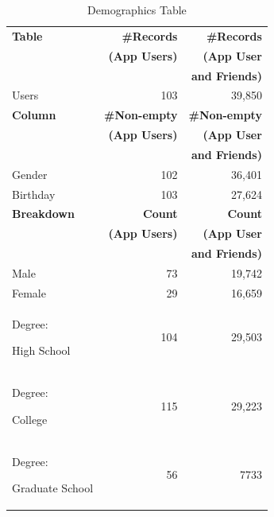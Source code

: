 \begin{table}
\centering
\caption{\small Demographics Table}
\label{tab:demographics}
\begin{tabular}{|>{\small}p{2cm}|>{\small}r|>{\small}r|}
\hline
\textbf{Table} & \textbf{\#Records} & \textbf{\#Records} \\
& \textbf{(App Users)} & \textbf{(App User} \\
& & \textbf{and Friends)} \\
\hline
Users & 103 & 39,850 \\
\hline
\hline
\textbf{Column} & \textbf{\#Non-empty} & \textbf{\#Non-empty} \\
& \textbf{(App Users)} & \textbf{(App User} \\
& & \textbf{and Friends)} \\
\hline
Gender & 102 & 36,401 \\
\hline
Birthday & 103 & 27,624 \\
\hline
\hline
\textbf{Breakdown} & \textbf{Count} & \textbf{Count} \\
& \textbf{(App Users)} & \textbf{(App User} \\
& & \textbf{and Friends)} \\
\hline
Male & 73 & 19,742 \\
\hline
Female & 29 & 16,659 \\
\hline
Degree:\par High School & 104 & 29,503 \\
\hline
Degree:\par College & 115 & 29,223 \\
\hline
Degree:\par Graduate School & 56 & 7733 \\
\hline
\end{tabular}
\end{table}


